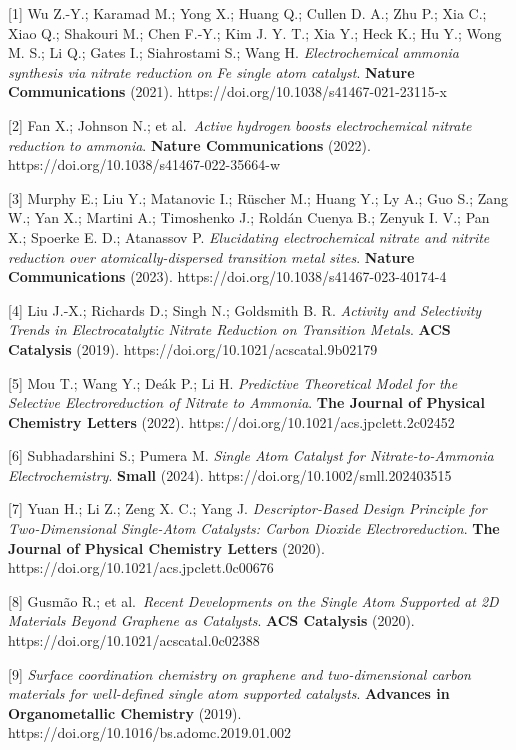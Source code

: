 \documentclass[
]{article}
\begin{document}
{[}1{]} Wu Z.-Y.; Karamad M.; Yong X.; Huang Q.; Cullen D. A.; Zhu P.;
Xia C.; Xiao Q.; Shakouri M.; Chen F.-Y.; Kim J. Y. T.; Xia Y.; Heck K.;
Hu Y.; Wong M. S.; Li Q.; Gates I.; Siahrostami S.; Wang H.
\emph{Electrochemical ammonia synthesis via nitrate reduction on Fe
single atom catalyst}. \textbf{Nature Communications} (2021).
https://doi.org/10.1038/s41467-021-23115-x

{[}2{]} Fan X.; Johnson N.; et al.~\emph{Active hydrogen boosts
electrochemical nitrate reduction to ammonia}. \textbf{Nature
Communications} (2022). https://doi.org/10.1038/s41467-022-35664-w

{[}3{]} Murphy E.; Liu Y.; Matanovic I.; Rüscher M.; Huang Y.; Ly A.;
Guo S.; Zang W.; Yan X.; Martini A.; Timoshenko J.; Roldán Cuenya B.;
Zenyuk I. V.; Pan X.; Spoerke E. D.; Atanassov P. \emph{Elucidating
electrochemical nitrate and nitrite reduction over atomically-dispersed
transition metal sites}. \textbf{Nature Communications} (2023).
https://doi.org/10.1038/s41467-023-40174-4

{[}4{]} Liu J.-X.; Richards D.; Singh N.; Goldsmith B. R. \emph{Activity
and Selectivity Trends in Electrocatalytic Nitrate Reduction on
Transition Metals}. \textbf{ACS Catalysis} (2019).
https://doi.org/10.1021/acscatal.9b02179

{[}5{]} Mou T.; Wang Y.; Deák P.; Li H. \emph{Predictive Theoretical
Model for the Selective Electroreduction of Nitrate to Ammonia}.
\textbf{The Journal of Physical Chemistry Letters} (2022).
https://doi.org/10.1021/acs.jpclett.2c02452

{[}6{]} Subhadarshini S.; Pumera M. \emph{Single Atom Catalyst for
Nitrate-to-Ammonia Electrochemistry}. \textbf{Small} (2024).
https://doi.org/10.1002/smll.202403515

{[}7{]} Yuan H.; Li Z.; Zeng X. C.; Yang J. \emph{Descriptor-Based
Design Principle for Two-Dimensional Single-Atom Catalysts: Carbon
Dioxide Electroreduction}. \textbf{The Journal of Physical Chemistry
Letters} (2020). https://doi.org/10.1021/acs.jpclett.0c00676

{[}8{]} Gusmão R.; et al.~\emph{Recent Developments on the Single Atom
Supported at 2D Materials Beyond Graphene as Catalysts}. \textbf{ACS
Catalysis} (2020). https://doi.org/10.1021/acscatal.0c02388

{[}9{]} \emph{Surface coordination chemistry on graphene and
two-dimensional carbon materials for well-defined single atom supported
catalysts}. \textbf{Advances in Organometallic Chemistry} (2019).
https://doi.org/10.1016/bs.adomc.2019.01.002
\end{document}
